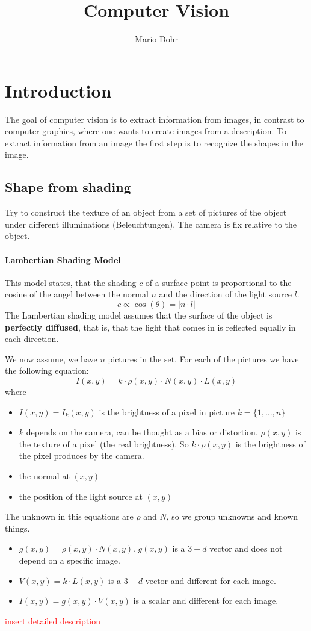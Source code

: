\documentclass[10pt,a4paper]{article}
\author{Mario Dohr}
\title{Computer Vision}
\begin{document}
\maketitle
\section{Introduction}
The goal of computer vision is to extract information from images, in contrast to computer graphics, where one wants to create images
from a description. To extract information from an image the first step is to recognize the shapes in the image.

\subsection{Shape from shading}
Try to construct the texture of an object from a set of pictures of the object under different illuminations (Beleuchtungen).
The camera is fix relative to the object.

\paragraph{Lambertian Shading Model}
This model states, that the shading $c$ of a surface point is proportional to the cosine of the angel between the normal $n$ and 
the direction of the light source $l$.
\[ c \propto \cos(\theta) = | n \cdot l | \]
The Lambertian shading model assumes that the surface of the object is \textbf{perfectly diffused}, that is, that the light that comes in is reflected equally in each direction.

We now assume, we have $n$ pictures in the set. For each of the pictures we have the following equation:
\[ I(x,y) = k \cdot \rho(x,y) \cdot N(x,y) \cdot L(x,y)\]
where 
\begin{itemize}
\item $I(x,y) = I_k(x,y)$ is the brightness of a pixel in picture $k = \{1, \dots , n\}$
\item $k$ depends on the camera, can be thought as a bias or distortion. $\rho(x,y)$ is the texture of a pixel (the real brightness). So $k \cdot \rho(x,y)$ is the brightness of the pixel produces by the camera.
\item the normal at $(x,y)$
\item the position of the light source at $(x,y)$
\end{itemize}
The unknown in this equations are $\rho$ and $N$, so we group unknowns and known things.
\begin{itemize}
\item $g(x,y) = \rho(x,y) \cdot N(x,y)$. $g(x,y)$ is a $3-d$ vector and does not depend on a specific image.
\item $V(x,y) = k \cdot L(x,y)$ is a $3-d$ vector and different for each image.
\item $I(x,y) = g(x,y) \cdot V(x,y)$ is a scalar and different for each image.
\end{itemize}
\textcolor{red}{insert detailed description}
\end{document}
